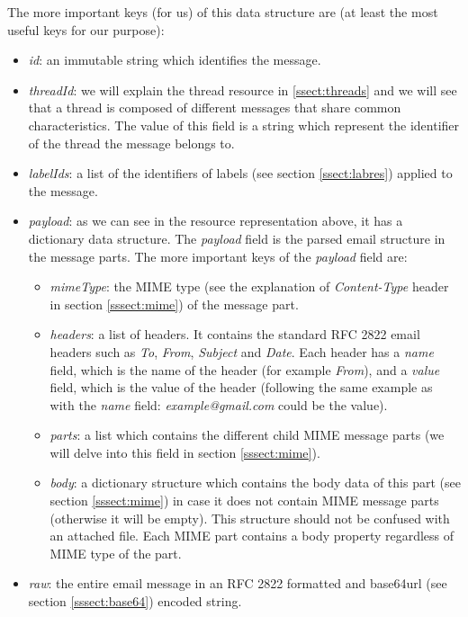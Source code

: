 The more important keys (for us) of this data structure are (at least the most useful keys for our purpose):
\begin{itemize}
	\item\textit{id}: an immutable string which identifies the message.
	\item\textit{threadId}: we will explain the thread resource in \ref{ssect:threads} and we will see that a thread is composed of different messages that share common characteristics. The value of this field is a string which represent the identifier of the thread the message belongs to.
	\item\textit{labelIds}: a list of the identifiers of labels (see section \ref{ssect:labres}) applied to the message.
	\item\textit{payload}: as we can see in the resource representation above, it has a dictionary data structure. The \textit{payload} field is the parsed email structure in the message parts. The more important keys of the \textit{payload} field are:
	\begin{itemize}
		\item\textit{mimeType}: the MIME type (see the explanation of \textit{Content-Type} header in section \ref{sssect:mime}) of the message part.
		\item\textit{headers}: a list of headers. It contains the standard RFC 2822 \citep{rfc2822} email headers such as \textit{To}, \textit{From}, \textit{Subject} and \textit{Date}. Each header has a \textit{name} field, which is the name of the header (for example \textit{From}), and a \textit{value} field, which is the value of the header (following the same example as with the \textit{name} field: \textit{example@gmail.com} could be the value).
		\item\textit{parts}: a list which contains the different child MIME message parts (we will delve into this field in section \ref{sssect:mime}).
		\item\textit{body}: a dictionary structure which contains the body data of this part (see section \ref{sssect:mime}) in case it does not contain MIME message parts (otherwise it will be empty). This structure should not be confused with an attached file. Each MIME part contains a body property regardless of MIME type of the part.
	\end{itemize}
	\item\textit{raw}: the entire email message in an RFC 2822 \citep{rfc2822} formatted and base64url (see section \ref{sssect:base64}) encoded string.
\end{itemize}

